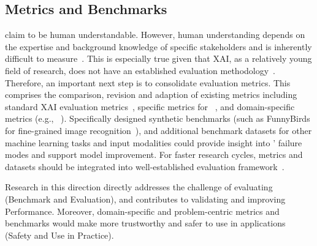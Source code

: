 \subsection{Metrics and Benchmarks}
\label{ssec:directions:benchmarks}
\ppms claim to be human understandable. However, human understanding depends on the expertise and background knowledge of specific stakeholders and is inherently difficult to measure~\cite{Boogert_2018_Measuringunderstandingindividual}. This is especially true given that XAI, as a relatively young field of research, does not have an established evaluation methodology~\cite{Nauta2023_csur_evaluating-xai-survey}.
Therefore, an important next step is to consolidate evaluation metrics. This comprises the comparison, revision and adaption of existing metrics including standard XAI evaluation metrics~\cite{Nauta2023_csur_evaluating-xai-survey}, specific metrics for \ppms~\cite{Nauta2023_wcxai_co-12-for-prototype-models,Huang_2023_EvaluationImprovementInterpretability}, and domain-specific metrics (e.g., ~\cite{Pathak_2024_PrototypebasedInterpretableBreast}).
Specifically designed synthetic benchmarks (such as FunnyBirds for fine-grained image recognition~\cite{Hesse_2023_FunnyBirdsSyntheticVision}), and additional benchmark datasets for other machine learning tasks and input modalities could provide insight into \ppms' failure modes and support model improvement. 
For faster research cycles, metrics and datasets should be integrated into well-established evaluation framework~\citep{Le2023_ijcai_benchmarking-xai}.

Research in this direction directly addresses the challenge of evaluating \ppms (\texorpdfstring{\colorbox[RGB]{156,198,246}{Benchmark and Evaluation}}{Benchmark and Evaluation}),
and contributes to validating and improving \texorpdfstring{\colorbox[RGB]{156,198,246}{Performance}}{Performance}. %
Moreover, domain-specific and problem-centric metrics and benchmarks would make \ppms more trustworthy and safer to use in applications (\texorpdfstring{\colorbox[RGB]{242,96,119}{Safety and Use in Practice}}{Safety and Use in Practice}).
